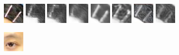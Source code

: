 \documentclass[10pt,twocolumn,letterpaper]{article}
\begin{document}
\begin{figure}[t]
\begin{minipage}[t]{1\linewidth}
\centering
\includegraphics[width=0.11\linewidth]{img/page1_example/hairpin_photo_patch.png}
\includegraphics[width=0.11\linewidth]{img/page1_example/hairpin_mrf_patch.png}
\includegraphics[width=0.11\linewidth]{img/page1_example/hairpin_wmrf_patch.png}
\includegraphics[width=0.11\linewidth]{img/page1_example/hairpin_ssd_patch.png}
\includegraphics[width=0.11\linewidth]{img/page1_example/hairpin_fcnn_patch.png}
\includegraphics[width=0.11\linewidth]{img/page1_example/hairpin_bfcn_patch.png}
\includegraphics[width=0.11\linewidth]{img/page1_example/hairpin_deepart_patch.jpg}
\includegraphics[width=0.11\linewidth]{img/page1_example/hairpin_ours_patch2.png}
\end{minipage}
\begin{minipage}[t]{1\linewidth}
\centering
\includegraphics[width=0.11\linewidth]{img/page1_example/eye_photo.png}

\end{minipage}
\end{figure}
\end{document}
